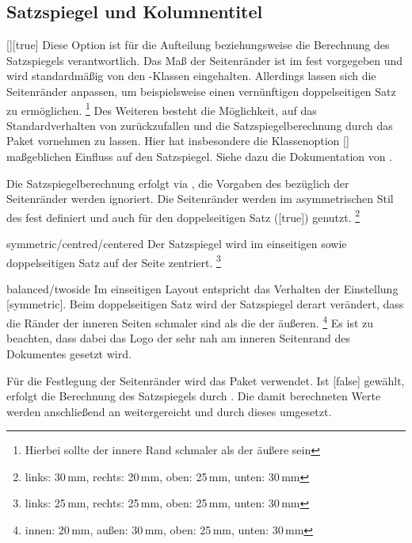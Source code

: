 \subsection{Satzspiegel und Kolumnentitel}
\begin{Declaration}{[\PSet]}[true]%
\printdeclarationlist%
%
%
%
%
Diese Option ist für die Aufteilung beziehungsweise die Berechnung des 
Satzspiegels verantwortlich. Das Maß der Seitenränder ist im \CD fest 
vorgegeben und wird standardmäßig von den \TUDScript-Klassen eingehalten. 
Allerdings lassen sich die Seitenränder anpassen, um beispielsweise einen 
vernünftigen doppelseitigen Satz zu ermöglichen.%
\footnote{Hierbei sollte der innere Rand schmaler als der äußere sein}
Des Weiteren besteht die Möglichkeit, auf das Standardverhalten von 
\KOMAScript{} zurückzufallen und die Satzspiegelberechnung durch das Paket
 vornehmen zu lassen. Hier hat insbesondere die Klassenoption 
[\PSet] maßgeblichen Einfluss auf den Satzspiegel. Siehe dazu die 
Dokumentation von \KOMAScript{}.
%
\begin{values}
\itemfalse
  Die Satzspiegelberechnung erfolgt via , die Vorgaben des 
  \CDs bezüglich der Seitenränder werden ignoriert.
  Die Seitenränder werden im asymmetrischen Stil des \CDs fest definiert und 
  auch für den doppelseitigen Satz ([true]) genutzt.%
  \footnote{links: 30\,mm, rechts: 20\,mm, oben: 25\,mm, unten: 30\,mm}
\item[symmetric/centred/centered]
  Der Satzspiegel wird im einseitigen sowie doppelseitigen Satz auf der Seite 
  zentriert.%
  \footnote{links: 25\,mm, rechts: 25\,mm, oben: 25\,mm, unten: 30\,mm}
\item[balanced/twoside]
  Im einseitigen Layout entspricht das Verhalten der Einstellung 
  [symmetric]. Beim doppelseitigen Satz wird der Satzspiegel 
  derart verändert, dass die Ränder der inneren Seiten schmaler sind als die 
  der äußeren.%
  \footnote{innen: 20\,mm, außen: 30\,mm, oben: 25\,mm, unten: 30\,mm}
  Es ist zu beachten, dass dabei das Logo der \TnUD sehr nah am inneren 
  Seitenrand des Dokumentes gesetzt wird.
\end{values}
%
Für die Festlegung der Seitenränder wird das Paket  
verwendet. Ist [false] gewählt, erfolgt die Berechnung des 
Satzspiegels durch . Die damit berechneten Werte werden 
anschließend an  weitergereicht und durch dieses umgesetzt.
\end{Declaration}

